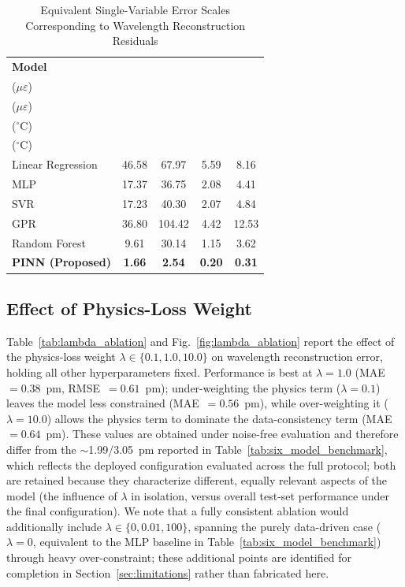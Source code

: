 \documentclass[journal,twoside,web]{ieeecolor}
\begin{document}
\begin{table}[!t]
\caption{Equivalent Single-Variable Error Scales Corresponding to Wavelength Reconstruction Residuals}
\label{tab:physical_unit_errors}
\centering
\renewcommand{\arraystretch}{1.2}
\setlength{\tabcolsep}{4pt}
\begin{tabular}{|l|c|c|c|c|}
\hline
\textbf{Model} &
\makecell{\textbf{MAE}\\($\mu\varepsilon$)} &
\makecell{\textbf{RMSE}\\($\mu\varepsilon$)} &
\makecell{\textbf{MAE}\\($^\circ$C)} &
\makecell{\textbf{RMSE}\\($^\circ$C)} \\
\hline
Linear Regression & 46.58 & 67.97 & 5.59 & 8.16 \\
MLP & 17.37 & 36.75 & 2.08 & 4.41 \\
SVR & 17.23 & 40.30 & 2.07 & 4.84 \\
GPR & 36.80 & 104.42 & 4.42 & 12.53 \\
Random Forest & 9.61 & 30.14 & 1.15 & 3.62 \\
\textbf{PINN (Proposed)} & \textbf{1.66} & \textbf{2.54} & \textbf{0.20} & \textbf{0.31} \\
\hline
\end{tabular}
\end{table}

\subsection{Effect of Physics-Loss Weight}
\label{subsec:lambda_ablation}

Table~\ref{tab:lambda_ablation} and Fig.~\ref{fig:lambda_ablation} report the
effect of the physics-loss weight $\lambda \in \{0.1, 1.0, 10.0\}$ on
wavelength reconstruction error, holding all other hyperparameters fixed.
Performance is best at $\lambda=1.0$ (MAE~$=0.38$~pm, RMSE~$=0.61$~pm);
under-weighting the physics term ($\lambda=0.1$) leaves the model less
constrained (MAE~$=0.56$~pm), while over-weighting it ($\lambda=10.0$)
allows the physics term to dominate the data-consistency term
(MAE~$=0.64$~pm). These values are obtained under noise-free evaluation and
therefore differ from the $\sim$1.99/3.05~pm reported in
Table~\ref{tab:six_model_benchmark}, which reflects the deployed
configuration evaluated across the full protocol; both are retained because
they characterize different, equally relevant aspects of the model (the
influence of $\lambda$ in isolation, versus overall test-set performance
under the final configuration). We note that a fully consistent ablation
would additionally include $\lambda \in \{0, 0.01, 100\}$, spanning the
purely data-driven case ($\lambda=0$, equivalent to the MLP baseline in
Table~\ref{tab:six_model_benchmark}) through heavy over-constraint; these
additional points are identified for completion in
Section~\ref{sec:limitations} rather than fabricated here.
\end{document}
